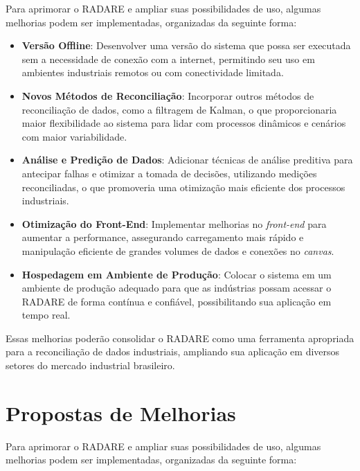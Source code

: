 Para aprimorar o RADARE e ampliar suas possibilidades de uso, algumas melhorias podem ser implementadas, organizadas da seguinte forma:

\begin{itemize}
    \item \textbf{Versão Offline}: Desenvolver uma versão do sistema que possa ser executada sem a necessidade de conexão com a internet, permitindo seu uso em ambientes industriais remotos ou com conectividade limitada.
    
    \item \textbf{Novos Métodos de Reconciliação}: Incorporar outros métodos de reconciliação de dados, como a filtragem de Kalman, o que proporcionaria maior flexibilidade ao sistema para lidar com processos dinâmicos e cenários com maior variabilidade.
    
    \item \textbf{Análise e Predição de Dados}: Adicionar técnicas de análise preditiva para antecipar falhas e otimizar a tomada de decisões, utilizando medições reconciliadas, o que promoveria uma otimização mais eficiente dos processos industriais.
    
    \item \textbf{Otimização do Front-End}: Implementar melhorias no \textit{front-end} para aumentar a performance, assegurando carregamento mais rápido e manipulação eficiente de grandes volumes de dados e conexões no \textit{canvas}.
    
    \item \textbf{Hospedagem em Ambiente de Produção}: Colocar o sistema em um ambiente de produção adequado para que as indústrias possam acessar o RADARE de forma contínua e confiável, possibilitando sua aplicação em tempo real.
\end{itemize}

Essas melhorias poderão consolidar o RADARE como uma ferramenta apropriada para a reconciliação de dados industriais, ampliando sua aplicação em diversos setores do mercado industrial brasileiro.

\section{Propostas de Melhorias}

Para aprimorar o RADARE e ampliar suas possibilidades de uso, algumas melhorias podem ser implementadas, organizadas da seguinte forma:

